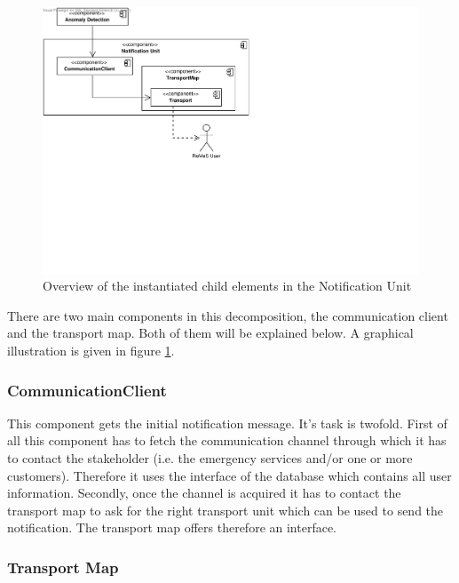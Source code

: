 \begin{figure}[H]
	\begin{centering}
		\includegraphics[width=\textwidth]{figs/add-it8-elements.pdf}
		\caption{Overview of the instantiated child elements in the Notification Unit}
		\label{fig:it8/elements}
	\end{centering}
\end{figure}

\npar There are two main components in this decomposition, the communication
client and the transport map. Both of them will be explained below. A graphical
illustration is given in figure \ref{fig:it8/elements}.

\subsubsection{CommunicationClient} 

\npar This component gets the initial notification message. It's task is
twofold. First of all this component has to fetch the communication channel
through which it has to contact the stakeholder (i.e. the emergency services
and/or one or more customers). Therefore it uses the
 interface of the database which contains all user
information. Secondly, once the channel is acquired it has to contact the
transport map to ask for the right transport unit which can be used to send the
notification. The transport map offers therefore an 
interface.

\subsubsection{Transport Map}


